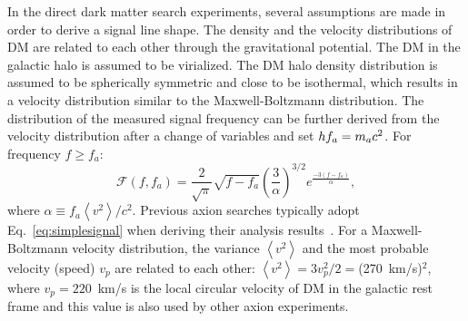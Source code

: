 In the direct dark matter search experiments, several assumptions are 
made in order to derive a signal line shape. 
The density and the velocity distributions of DM are related to each other 
through the gravitational potential. The DM in the galactic halo is assumed 
to be virialized. The DM halo density distribution is assumed 
to be spherically symmetric and close to be isothermal, which results in a 
velocity distribution similar to the Maxwell-Boltzmann distribution. The 
distribution of the measured signal frequency can be further derived from the 
velocity distribution after a change of variables and set 
\(hf_a = m_a c^2\). 
For frequency $f\ge f_a$:
\begin{equation}
\mathcal{F}(f, f_a) = \frac{2}{\sqrt{\pi}}\sqrt{f-f_a}\left(\frac{3}{\alpha}\right)^{3/2}
e^{\frac{-3\left(f-f_a\right)}{\alpha}}, 
\label{eq:simplesignal}
\end{equation}
where $\alpha\equiv  f_a \left<v^2\right>/c^2$. Previous axion searches 
typically adopt Eq.~\eqref{eq:simplesignal} when deriving their analysis 
results~\cite{HAYSTACII}. For a Maxwell-Boltzmann velocity 
distribution, the variance $\left<v^2\right>$ and the most probable velocity 
(speed) $v_p$ are related to each other:
$\left<v^2\right>=3v_p^2/2=$(270~km/s)$^2$, where $v_p=220$~km/s is the local 
circular velocity of DM in the galactic rest frame and this value is also 
used by other axion experiments. 

